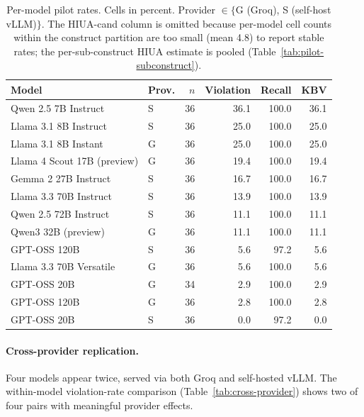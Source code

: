 \documentclass{article}
\begin{document}
\begin{table}[ht]
\centering
\caption{Per-model pilot rates. Cells in percent. Provider $\in \{$G (Groq), S (self-host vLLM)$\}$. The HIUA-cand column is omitted because per-model cell counts within the construct partition are too small (mean 4.8) to report stable rates; the per-sub-construct HIUA estimate is pooled (Table~\ref{tab:pilot-subconstruct}).}
\label{tab:pilot-per-model}
\small
\begin{tabular}{llrrrr}
\toprule
Model & Prov. & $n$ & Violation & Recall & KBV \\
\midrule
Qwen 2.5 7B Instruct          & S & 36 & 36.1 & 100.0 & 36.1 \\
Llama 3.1 8B Instruct          & S & 36 & 25.0 & 100.0 & 25.0 \\
Llama 3.1 8B Instant           & G & 36 & 25.0 & 100.0 & 25.0 \\
Llama 4 Scout 17B (preview)    & G & 36 & 19.4 & 100.0 & 19.4 \\
Gemma 2 27B Instruct           & S & 36 & 16.7 & 100.0 & 16.7 \\
Llama 3.3 70B Instruct         & S & 36 & 13.9 & 100.0 & 13.9 \\
Qwen 2.5 72B Instruct          & S & 36 & 11.1 & 100.0 & 11.1 \\
Qwen3 32B (preview)            & G & 36 & 11.1 & 100.0 & 11.1 \\
GPT-OSS 120B                   & S & 36 &  5.6 &  97.2 &  5.6 \\
Llama 3.3 70B Versatile        & G & 36 &  5.6 & 100.0 &  5.6 \\
GPT-OSS 20B                    & G & 34 &  2.9 & 100.0 &  2.9 \\
GPT-OSS 120B                   & G & 36 &  2.8 & 100.0 &  2.8 \\
GPT-OSS 20B                    & S & 36 &  0.0 &  97.2 &  0.0 \\
\bottomrule
\end{tabular}
\end{table}

\paragraph{Cross-provider replication.}
Four models appear twice, served via both Groq and self-hosted vLLM. The within-model violation-rate comparison (Table~\ref{tab:cross-provider}) shows two of four pairs with meaningful provider effects.
\end{document}
